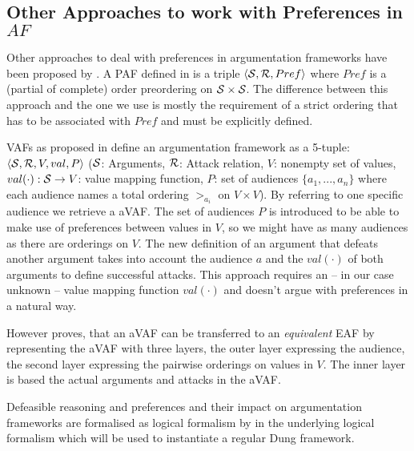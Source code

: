 \subsection{Other Approaches to work with Preferences in $AF$}
\label{sub:paf}
Other approaches to deal with preferences in argumentation frameworks have been proposed by \cite{amgoud,amgoud1998,Bench2003,pollock1987, prakken1997}. A \gls{PAF} defined in \cite{amgoud1998} is  a triple $\langle \S, \R, Pref \rangle$ where $Pref$ is a (partial of complete) order preordering on $\S \times \S$. The difference between this approach and the one we use is mostly the requirement of a strict ordering that has to be associated with $Pref$ and must be explicitly defined.
\label{sub:vaf}

\Glspl{VAF} as proposed in \cite{Bench2003} define an argumentation framework as a 5-tuple: $\langle \S, \R, V, val, P \rangle$ ($\S$: Arguments, $\R$: Attack relation, $V$: nonempty set of values, $val(\cdot): \S \rightarrow V$: value mapping function, $P$: set of audiences $\{a_1, ..., a_n\}$ where each audience names a total ordering $>_{a_i}$ on $V \times V$). By referring to one specific audience we retrieve a \gls{aVAF}. The set of audiences $P$ is introduced to be able to make use of preferences between values in $V$, so we might have as many audiences as there are orderings on $V$. The new definition of an argument that defeats another argument takes into account the audience $a$ and the $val(\cdot)$ of both arguments to define successful attacks. This approach requires an -- in our case unknown -- value mapping function $val(\cdot)$ and doesn't argue with preferences in a natural way. 

However \cite{Modgil2009} proves, that an \gls{aVAF} can be transferred to an \textit{equivalent} \gls{EAF} by representing the \gls{aVAF} with three layers, the outer layer expressing the audience, the second layer expressing the pairwise orderings on values in $V$. The inner layer is based the actual arguments and attacks in the \gls{aVAF}.

Defeasible reasoning and preferences and their impact on argumentation frameworks are formalised as logical formalism by \cite{pollock1987, prakken1997} in the underlying logical formalism which will be used to instantiate a regular Dung framework.